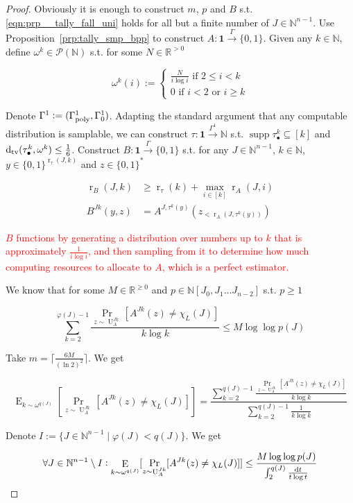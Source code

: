 \documentclass[11pt]{article}
\numberwithin{equation}{section}
\theoremstyle{definition}
\theoremstyle{plain}
\newcommand{\Bool}{\{0,1\}}
\newcommand{\Words}{{\Bool^*}}
\DeclareMathOperator{\Supp}{supp}
\DeclareMathOperator{\Prb}{Pr}
\DeclareMathOperator{\E}{E}
\DeclareMathOperator{\R}{r}
\DeclareMathOperator{\Un}{U}
\newcommand{\Dtv}{\operatorname{d}_{\textnormal{tv}}}
\newcommand{\Nats}{\mathbb{N}}
\newcommand{\Reals}{\mathbb{R}}
\newcommand{\NatPolyJ}{\Nats[J_0, J_1 \ldots J_{n-2}]}
\newcommand{\Ceil}[1]{\lceil #1 \rceil}
\newcommand{\GammaPoly}{\Gamma_{\textnormal{poly}}}
\newcommand{\Scheme}{\xrightarrow{\Gamma}}
\begin{document}
\begin{proof}

Obviously it is enough to construct ${m}$, ${p}$ and ${B}$ s.t. \ref{eqn:prp__tally_fall_uni} holds for all but a finite number of ${J \in \Nats^{n-1}}$. Use Proposition~\ref{prp:tally_smp_bpp} to construct ${A: \bm{1} \Scheme \Bool}$. Given any ${k \in \Nats}$, define ${\omega^k \in \mathcal{P}(\Nats)}$ s.t. for some ${N \in \Reals^{>0}}$

\[\omega^k(i):=\begin{cases}\frac{N}{i \log i} \text{ if } 2 \leq i < k\\0 \text{ if } i < 2 \text { or } i \geq k\end{cases}\]

Denote ${\Gamma^1:=(\GammaPoly^1,\Gamma_0^1)}$. Adapting the standard argument that any computable distribution is samplable, we can construct ${\tau: \bm{1} \xrightarrow{\Gamma^1} \Nats}$ s.t. ${\Supp \tau_\bullet^{k} \subseteq [k]}$ and ${\Dtv(\tau_\bullet^{k}, \omega^k) \leq \frac{1}{6}}$. Construct ${B: \bm{1} \Scheme \Bool}$ s.t. for any ${J \in \Nats^{n-1}}$, ${k \in \Nats}$, ${y \in \Bool^{\R_\tau(J,k)}}$ and ${z \in \Words}$

\begin{align*}
\R_B(J,k) &\geq \R_\tau(k) + \max_{i \in [k]} \R_A(J,i) \\
B^{Jk}(y,z) &= A^{J,\tau^{k}(y)}(z_{<\R_A(J,\tau^{k}(y))}) 
\end{align*}

\textcolor{red}{$B$ functions by generating a distribution over numbers up to $k$ that is approximately $\frac{1}{i\log i}$, and then sampling from it to determine how much computing resources to allocate to $A$, which is a perfect estimator.}

We know that for some ${M \in \Reals^{\geq 0}}$ and ${p \in \NatPolyJ}$ s.t. ${p \geq 1}$

\[\sum_{k=2}^{\varphi(J)-1} \frac{\Prb_{z \sim \Un_A^{Jk}}[A^{Jk}(z) \neq \chi_L(J)]}{k \log k} \leq M \log \log p(J)\]

Take ${m = \Ceil{\frac{6M}{(\ln 2)^2}}}$. We get

\[\E_{k \sim \omega^{q(J)}}[\Prb_{z \sim \Un_A^{Jk}}[A^{Jk}(z) \neq \chi_L(J)]]=\frac{\sum_{k=2}^{q(J)-1} \frac{\Prb_{z \sim \Un_A^{Jk}}[A^{Jk}(z) \neq \chi_L(J)]}{k \log k}}{\sum_{k=2}^{q(J)-1} \frac{1}{k \log k}}\]

Denote $I:=\{J \in \Nats^{n-1} \mid \varphi(J) < q(J)\}$. We get

\[\forall J \in \Nats^{n-1} \setminus I: \E_{k \sim \omega^{q(J)}}[\Prb_{z \sim \Un_A^{Jk}}[A^{Jk}(z) \neq \chi_L(J)]] \leq \frac{M \log \log p(J)}{\int_2^{q(J)} \frac{\dif t}{t \log t}}\]


\end{proof}
\end{document}
